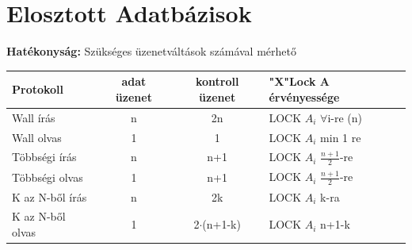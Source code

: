 \section{Elosztott Adatbázisok}

 \textbf{Hatékonyság:} Szükséges üzenetváltások számával mérhető

\begin{center}
	\begin{tabular}{|l||c|c||l|}
 	 \hline
	  Protokoll & adat üzenet & kontroll üzenet & "X"Lock A érvényessége \\ \hline \hline
	  Wall írás & n & 2n & LOCK $A_i$ $\forall$i-re (n)\\ \cline{2-4}
	  Wall olvas & 1 & 1 & LOCK $A_i$ min 1 re  \\ \hline
	  Többségi írás & n & n+1 & LOCK $A_i$ $\frac{n+1}{2}$-re \\ \cline{2-4}
 	  Többségi olvas & 1 & n+1 & LOCK $A_i$ $\frac{n+1}{2}$-re \\ \hline
 	  K az N-ből írás & n & 2k & LOCK $A_i$ k-ra\\ \cline{2-4}
 	  K az N-ből olvas  & 1 & 2$\cdot$(n+1-k) & LOCK $A_i$ n+1-k\\
 	 \hline
	\end{tabular}
\end{center}

